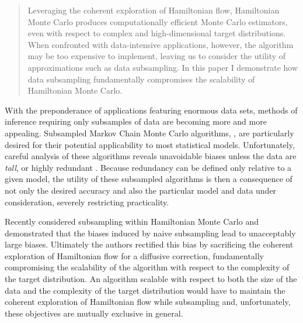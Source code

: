 \documentclass{article}
\begin{document}


\begin{abstract}
Leveraging the coherent exploration of Hamiltonian flow, Hamiltonian Monte Carlo 
produces computationally efficient Monte Carlo estimators, even with respect to
complex and high-dimensional target distributions.  When confronted with data-intensive 
applications, however, the algorithm may be too expensive to implement, leaving us to 
consider the utility of approximations such as data subsampling.  In this paper I demonstrate
how data subsampling fundamentally compromises the scalability of Hamiltonian Monte Carlo.
\end{abstract}

With the preponderance of applications featuring enormous data sets,
methods of inference requiring only subsamples of data are becoming 
more and more appealing.  Subsampled Markov Chain Monte Carlo 
algorithms, \cite{NeiswangerEtAl:2013, WellingEtAl:2011}, are particularly
desired for their potential applicability to most statistical models.  Unfortunately, 
careful analysis of these algorithms reveals unavoidable biases unless 
the data are \textit{tall}, or highly redundant 
\cite{BardenetEtAl:2014, TehEtAl:2014, VollmerEtAl:2015}.  
Because redundancy can be defined only relative to a given model, the
utility of these subsampled algorithms is then a consequence of not only 
the desired accuracy and also the particular model and data under consideration, 
severely restricting practicality.

Recently \cite{ChenEtAl:2014} considered subsampling within Hamiltonian
Monte Carlo \cite{DuaneEtAl:1987, Neal:2011, BetancourtEtAl:2014} and 
demonstrated that the biases induced by naive subsampling lead to 
unacceptably large biases.  Ultimately the authors rectified this bias by
sacrificing the coherent exploration of Hamiltonian flow for a diffusive correction, 
fundamentally compromising the scalability of the algorithm with respect to
the complexity of the target distribution.  An algorithm scalable with respect to
both the size of the data and the complexity of the target distribution would
have to maintain the coherent exploration of Hamiltonian flow while subsampling 
and, unfortunately, these objectives are mutually exclusive in general.
\end{document}
